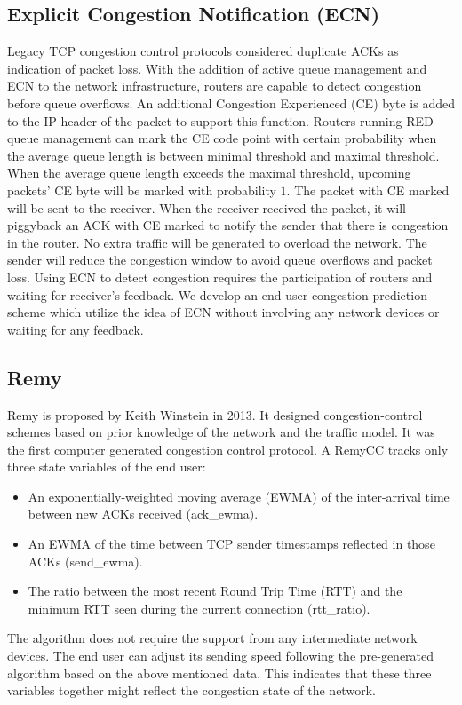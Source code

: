 \subsection{Explicit Congestion Notification (ECN)}
\par Legacy TCP congestion control protocols considered duplicate ACKs as indication of packet loss. With the addition of active queue management and ECN \cite{ramakrishnan2001rfc} to the network infrastructure, routers are capable to detect congestion before queue overflows. An additional Congestion Experienced (CE) byte is added to the IP header of the packet to support this function. Routers running RED queue management can mark the CE code point with certain probability when the average queue length is between minimal threshold and maximal threshold. When the average queue length exceeds the maximal threshold, upcoming packets' CE byte will be marked with probability $1$. The packet with CE marked will be sent to the receiver. When the receiver received the packet, it will piggyback an ACK with CE marked to notify the sender that there is congestion in the router. No extra traffic will be generated to overload the network. The sender will reduce the congestion window to avoid queue overflows and packet loss. Using ECN to detect congestion requires the participation of routers and waiting for receiver's feedback. We develop an end user congestion prediction scheme which utilize the idea of ECN without involving any network devices or waiting for any feedback.
\subsection{Remy}
\par Remy \cite{winstein2013tcp} is proposed by Keith Winstein in 2013. It designed congestion-control schemes based on prior knowledge of the network and the traffic model. It was the first computer generated congestion control protocol. A RemyCC tracks only three state variables of the end user:
\begin{itemize}
\item An exponentially-weighted moving average (EWMA) of the inter-arrival time between new ACKs received (ack\_ewma).
\item An EWMA of the time between TCP sender timestamps reflected in those ACKs (send\_ewma).
\item The ratio between the most recent Round Trip Time (RTT) and the minimum RTT seen during the current connection (rtt\_ratio).
\end{itemize}
The algorithm does not require the support from any intermediate network devices. The end user can adjust its sending speed following the pre-generated algorithm based on the above mentioned data. This indicates that these three variables together might reflect the congestion state of the network. 


